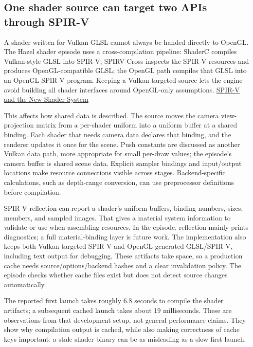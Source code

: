 \subsection{One shader source can target two APIs through SPIR-V}\label{06-engine-ii-ch026-one-shader-source-can-target-two-apis-through-spir-v}

\hypertarget{06-engine-ii-ch026-one-shader-source-can-target-two-apis-through-spir-v}{}

A shader written for Vulkan GLSL cannot always be handed directly to OpenGL. The Hazel shader episode uses a cross-compilation pipeline: ShaderC compiles Vulkan-style GLSL into SPIR-V; SPIRV-Cross inspects the SPIR-V resources and produces OpenGL-compatible GLSL; the OpenGL path compiles that GLSL into an OpenGL SPIR-V program. Keeping a Vulkan-targeted source lets the engine avoid building all shader interfaces around OpenGL-only assumptions. \href{https://www.youtube.com/watch?v=SXDlZRDjtXg}{SPIR-V and the New Shader System}

This affects how shared data is described. The source moves the camera view-projection matrix from a per-shader uniform into a uniform buffer at a shared binding. Each shader that needs camera data declares that binding, and the renderer updates it once for the scene. Push constants are discussed as another Vulkan data path, more appropriate for small per-draw values; the episode's camera buffer is shared scene data. Explicit sampler bindings and input/output locations make resource connections visible across stages. Backend-specific calculations, such as depth-range conversion, can use preprocessor definitions before compilation.

SPIR-V reflection can report a shader's uniform buffers, binding numbers, sizes, members, and sampled images. That gives a material system information to validate or use when assembling resources. In the episode, reflection mainly prints diagnostics; a full material-binding layer is future work. The implementation also keeps both Vulkan-targeted SPIR-V and OpenGL-generated GLSL/SPIR-V, including text output for debugging. These artifacts take space, so a production cache needs source/options/backend hashes and a clear invalidation policy. The episode checks whether cache files exist but does not detect source changes automatically.

The reported first launch takes roughly 6.8 seconds to compile the shader artifacts; a subsequent cached launch takes about 19 milliseconds. These are observations from that development setup, not general performance claims. They show why compilation output is cached, while also making correctness of cache keys important: a stale shader binary can be as misleading as a slow first launch.

